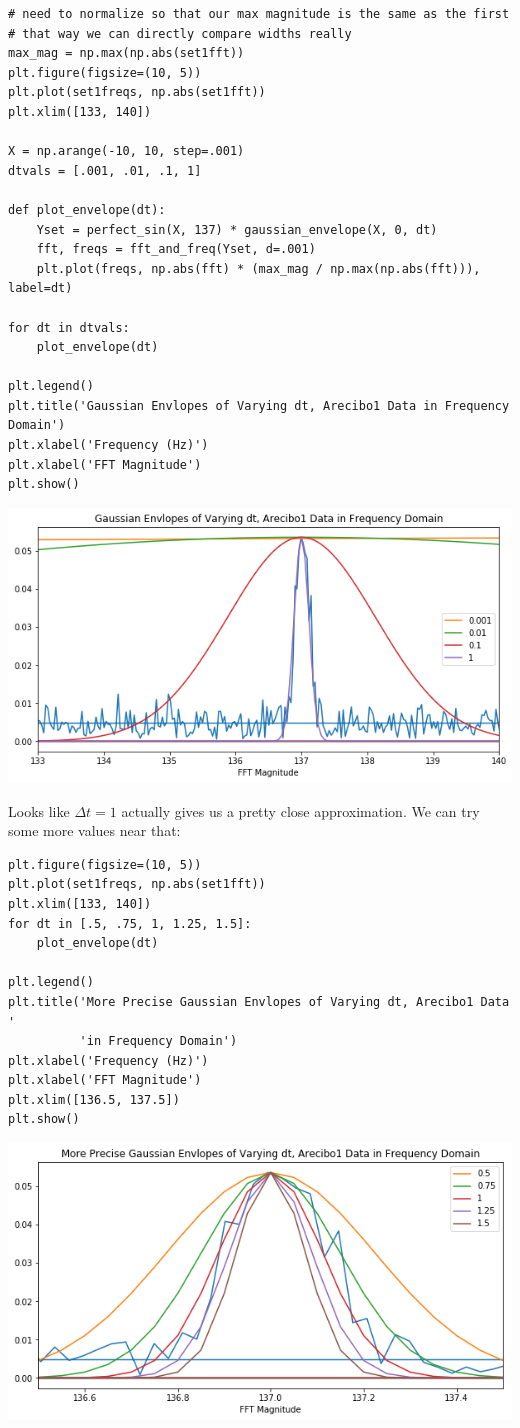 \documentclass[11pt]{article}
\begin{document}
\begin{verbatim}
# need to normalize so that our max magnitude is the same as the first
# that way we can directly compare widths really
max_mag = np.max(np.abs(set1fft))
plt.figure(figsize=(10, 5))
plt.plot(set1freqs, np.abs(set1fft))
plt.xlim([133, 140])

X = np.arange(-10, 10, step=.001)
dtvals = [.001, .01, .1, 1]

def plot_envelope(dt):
    Yset = perfect_sin(X, 137) * gaussian_envelope(X, 0, dt)
    fft, freqs = fft_and_freq(Yset, d=.001)
    plt.plot(freqs, np.abs(fft) * (max_mag / np.max(np.abs(fft))), label=dt)

for dt in dtvals:
    plot_envelope(dt)

plt.legend()
plt.title('Gaussian Envlopes of Varying dt, Arecibo1 Data in Frequency Domain') 
plt.xlabel('Frequency (Hz)')
plt.xlabel('FFT Magnitude')
plt.show()
\end{verbatim}

\includegraphics[width=.9\linewidth]{./obipy-resources/17087JAq.png}

Looks like $\Delta t = 1$ actually gives us a pretty close approximation. We
can try some more values near that:

\begin{verbatim}
plt.figure(figsize=(10, 5))
plt.plot(set1freqs, np.abs(set1fft))
plt.xlim([133, 140])
for dt in [.5, .75, 1, 1.25, 1.5]:
    plot_envelope(dt)

plt.legend()
plt.title('More Precise Gaussian Envlopes of Varying dt, Arecibo1 Data '
          'in Frequency Domain') 
plt.xlabel('Frequency (Hz)')
plt.xlabel('FFT Magnitude')
plt.xlim([136.5, 137.5])
plt.show()
\end{verbatim}

\includegraphics[width=.9\linewidth]{./obipy-resources/17087jU2.png}
\end{document}
